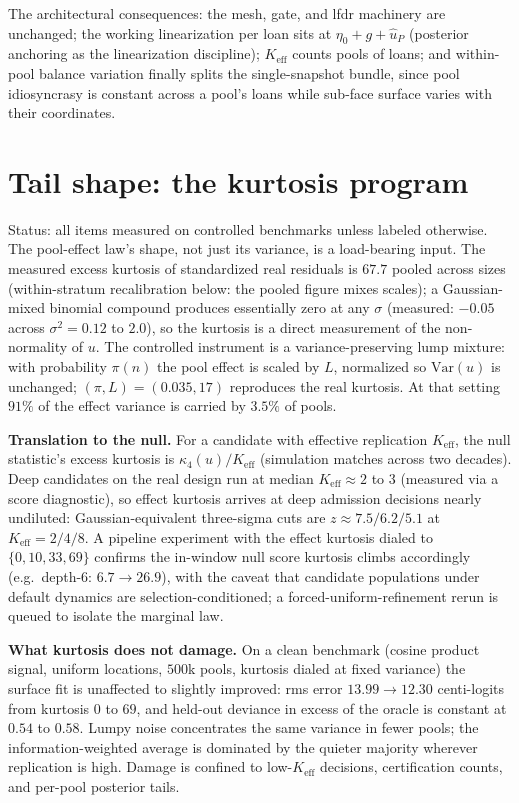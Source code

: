 \documentclass[11pt]{article}
\begin{document}
The architectural consequences: the mesh, gate, and lfdr machinery are
unchanged; the working linearization per loan sits at
$\eta_0 + g + \hat u_P$ (posterior anchoring as the linearization
discipline); $K_{\mathrm{eff}}$ counts pools of loans; and within-pool
balance variation finally splits the single-snapshot bundle, since pool
idiosyncrasy is constant across a pool's loans while sub-face surface
varies with their coordinates.


\section{Tail shape: the kurtosis program}\label{sec:kurtosis}

Status: all items measured on controlled benchmarks unless labeled
otherwise. The pool-effect law's shape, not just its variance, is a
load-bearing input. The measured excess kurtosis of standardized real
residuals is $67.7$ pooled across sizes (within-stratum recalibration
below: the pooled figure mixes scales); a Gaussian-mixed binomial compound produces
essentially zero at any $\sigma$ (measured: $-0.05$ across
$\sigma^2 = 0.12$ to $2.0$), so the kurtosis is a direct measurement of
the non-normality of $u$. The controlled instrument is a
variance-preserving lump mixture: with probability $\pi(n)$ the pool
effect is scaled by $L$, normalized so $\mathrm{Var}(u)$ is unchanged;
$(\pi, L) = (0.035, 17)$ reproduces the real kurtosis. At that setting
$91\%$ of the effect variance is carried by $3.5\%$ of pools.

\textbf{Translation to the null.} For a candidate with effective
replication $K_{\mathrm{eff}}$, the null statistic's excess kurtosis is
$\kappa_4(u)/K_{\mathrm{eff}}$ (simulation matches across two decades).
Deep candidates on the real design run at median $K_{\mathrm{eff}}
\approx 2$ to $3$ (measured via a score diagnostic), so effect kurtosis
arrives at deep admission decisions nearly undiluted:
Gaussian-equivalent three-sigma cuts are $z \approx 7.5 / 6.2 / 5.1$ at
$K_{\mathrm{eff}} = 2/4/8$. A pipeline experiment with the effect
kurtosis dialed to $\{0, 10, 33, 69\}$ confirms the in-window null
score kurtosis climbs accordingly (e.g.\ depth-6: $6.7 \to 26.9$),
with the caveat that candidate populations under default dynamics are
selection-conditioned; a forced-uniform-refinement rerun is queued to
isolate the marginal law.

\textbf{What kurtosis does not damage.} On a clean benchmark (cosine
product signal, uniform locations, $500$k pools, kurtosis dialed at
fixed variance) the surface fit is unaffected to slightly improved:
rms error $13.99 \to 12.30$ centi-logits from kurtosis $0$ to $69$, and
held-out deviance in excess of the oracle is constant at $0.54$ to
$0.58$. Lumpy noise concentrates the same variance in fewer pools; the
information-weighted average is dominated by the quieter majority
wherever replication is high. Damage is confined to low-$K_{\mathrm{eff}}$
decisions, certification counts, and per-pool posterior tails.
\end{document}
